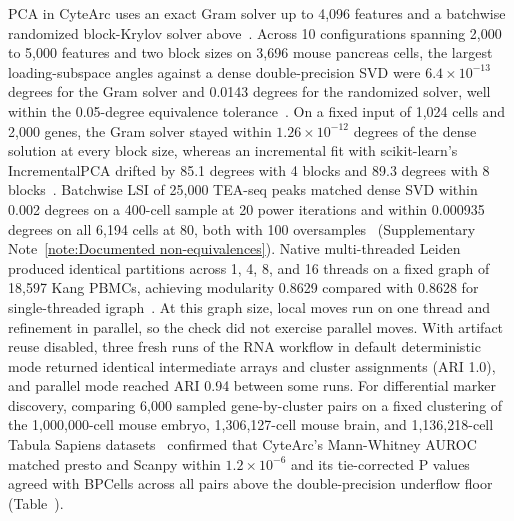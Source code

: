 PCA in CyteArc uses an exact Gram solver up to 4,096 features and a batchwise randomized block-Krylov solver above~\cite{halko2011finding,musco2015randomized}. Across 10 configurations spanning 2,000 to 5,000 features and two block sizes on 3,696 mouse pancreas cells, the largest loading-subspace angles against a dense double-precision SVD were $6.4\times 10^{-13}$ degrees for the Gram solver and 0.0143 degrees for the randomized solver, well within the 0.05-degree equivalence tolerance~\cite{bastidas2019}. On a fixed input of 1,024 cells and 2,000 genes, the Gram solver stayed within $1.26\times 10^{-12}$ degrees of the dense solution at every block size, whereas an incremental fit with scikit-learn's IncrementalPCA drifted by 85.1 degrees with 4 blocks and 89.3 degrees with 8 blocks~\cite{pedregosa2012scikitlearn}. Batchwise LSI of 25,000 TEA-seq peaks matched dense SVD within 0.002 degrees on a 400-cell sample at 20 power iterations and within 0.000935 degrees on all 6,194 cells at 80, both with 100 oversamples~\cite{cusanovich2018cisregulatory,swanson2021} (Supplementary Note~\ref{note:Documented non-equivalences}). Native multi-threaded Leiden produced identical partitions across 1, 4, 8, and 16 threads on a fixed graph of 18,597 Kang PBMCs, achieving modularity 0.8629 compared with 0.8628 for single-threaded igraph~\cite{traag2019,sahu2023gveleiden,kang2018}. At this graph size, local moves run on one thread and refinement in parallel, so the check did not exercise parallel moves. With artifact reuse disabled, three fresh runs of the RNA workflow in default deterministic mode returned identical intermediate arrays and cluster assignments (ARI 1.0), and parallel mode reached ARI 0.94 between some runs. For differential marker discovery, comparing 6,000 sampled gene-by-cluster pairs on a fixed clustering of the 1,000,000-cell mouse embryo, 1,306,127-cell mouse brain, and 1,136,218-cell Tabula Sapiens datasets~\cite{qiu2024,tabulasapiens2022,tabulasapiens2024} confirmed that CyteArc's Mann-Whitney AUROC matched presto and Scanpy within $1.2\times 10^{-6}$ and its tie-corrected P values agreed with BPCells across all pairs above the double-precision underflow floor~\cite{korsunsky2019presto,wolf2018,parks2025bpcells} (Table~).

\label{note:Cluster agreement across toolkits}

